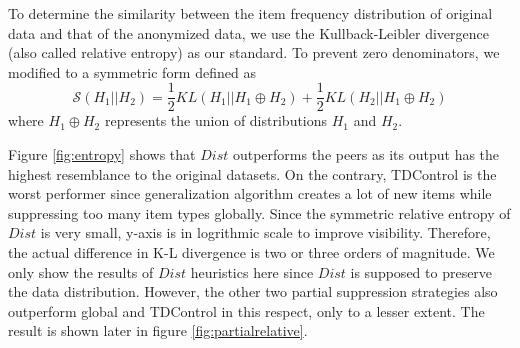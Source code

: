 To determine the similarity between the item frequency distribution
of original data and that of the anonymized data,
we use the Kullback-Leibler
divergence (also called relative entropy) as our standard.
To prevent zero denominators, we modified 
to a symmetric form \cite{Fisher:2008:DSF} defined as
\[\mathcal{S}(H_1||H_2)=\frac{1}{2}KL( H_1||H_1 \oplus H_2)+\frac{1}{2} KL( H_2||H_1 \oplus H_2)\]
where  $H_1 \oplus H_2$ represents the union of distributions $H_1$ and $H_2$.

Figure \ref{fig:entropy} shows that $Dist$ outperforms the peers
 as its output has the highest resemblance
to the original datasets.
On the contrary, TDControl is the worst performer
since generalization algorithm creates a lot of new items while
suppressing too many item types globally.
Since the symmetric relative entropy of $Dist$ is very small, y-axis is
in logrithmic scale to improve visibility. Therefore, the actual difference
in K-L divergence is two or three orders of magnitude.
We only show the results of $Dist$ heuristics here since $Dist$ is supposed to
preserve the data distribution.  However, the other two partial suppression
strategies also outperform global and TDControl in this respect, only to
a lesser extent. The result is shown later in figure \ref{fig:partialrelative}.



